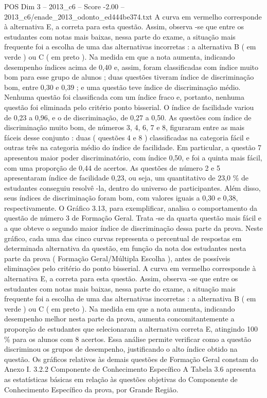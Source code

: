 \begin{textsample}{POS Dim 3 – 2013\_c6 – Score -2.00 – 2013\_c6/enade\_2013\_odonto\_ed444be374.txt}
A curva em vermelho corresponde à alternativa E, a correta para esta questão.
Assim, observa -se que entre os estudantes com notas mais baixas, nessa parte do exame, a situação mais frequente foi a escolha de uma das alternativas incorretas : a alternativa B ( em verde ) ou C ( em preto ).
Na medida em que a nota aumenta, indicando desempenho índices acima de 0,40 e, assim, foram classificadas com índice muito bom para esse grupo de alunos ; duas questões tiveram índice de discriminação bom, entre 0,30 e 0,39 ; e uma questão teve índice de discriminação médio.
Nenhuma questão foi classificada com um índice fraco e, portanto, nenhuma questão foi eliminada pelo critério ponto bisserial.
O índice de facilidade variou de 0,23 a 0,96, e o de discriminação, de 0,27 a 0,50.
As questões com índice de discriminação muito bom, de números 3, 4, 6, 7 e 8, figuraram entre as mais fáceis desse conjunto : duas ( questões 4 e 8 ) classificadas na categoria fácil e outras três na categoria médio do índice de facilidade.
Em particular, a questão 7 apresentou maior poder discriminatório, com índice 0,50, e foi a quinta mais fácil, com uma proporção de 0,44 de acertos.
As questões de número 2 e 5 apresentaram índice de facilidade 0,23, ou seja, um quantitativo de 23,0 \% de estudantes conseguiu resolvê -la, dentro do universo de participantes.
Além disso, seus índices de discriminação foram bom, com valores iguais a 0,30 e 0,38, respectivamente.
O Gráfico 3.13, para exemplificar, analisa o comportamento da questão de número 3 de Formação Geral.
Trata -se da quarta questão mais fácil e a que obteve o segundo maior índice de discriminação dessa parte da prova.
Neste gráfico, cada uma das cinco curvas representa o percentual de respostas em determinada alternativa da questão, em função da nota dos estudantes nesta parte da prova ( Formação Geral/Múltipla Escolha ), antes de possíveis eliminações pelo critério do ponto bisserial.
A curva em vermelho corresponde à alternativa E, a correta para esta questão.
Assim, observa -se que entre os estudantes com notas mais baixas, nessa parte do exame, a situação mais frequente foi a escolha de uma das alternativas incorretas : a alternativa B ( em verde ) ou C ( em preto ).
Na medida em que a nota aumenta, indicando desempenho melhor nesta parte da prova, aumenta concomitantemente a proporção de estudantes que selecionaram a alternativa correta E, atingindo 100 \% para os alunos com 8 acertos.
Essa análise permite verificar como a questão discriminou os grupos de desempenho, justificando o alto índice obtido na questão.
Os gráficos relativos às demais questões de Formação Geral constam do Anexo I. 3.2.2 Componente de Conhecimento Específico A Tabela 3.6 apresenta as estatísticas básicas em relação às questões objetivas do Componente de Conhecimento Específico da prova, por Grande Região.

\end{textsample}
